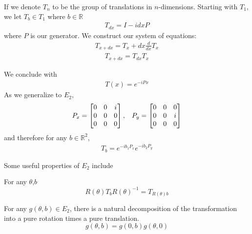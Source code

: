 \documentclass[compress,aspectratio=169,10pt,usenames,dvipsnames]{beamer}
\newcommand{\R}{\mathbb{R}}
\begin{document}
%
%
\begin{frame}
If we denote $T_n$ to be the group of translations in $n$-dimensions.
\vfill
Starting with $T_1$, we let $T_b\in T_1$ where $b\in \R$
\begin{equation}
\begin{aligned}
T_{dx} = I -idxP
\end{aligned}
\end{equation}
where $P$ is our generator.
\vfill
We construct our system of equations:
\begin{equation}\begin{aligned}T_{x+dx} = T_x + dx \frac{d}{dx}T_x\end{aligned}\end{equation}
\begin{equation}\begin{aligned}T_{x+dx} = T_{dx}T_x\end{aligned}\end{equation}
\vfill
\end{frame}
\begin{frame}
\vfill
We conclude with 
\begin{equation}\begin{aligned}T(x) = e^{-iPx}\end{aligned}\end{equation}
\vfill
As we generalize to $E_2$,
\begin{equation}\begin{aligned}P_x = \begin{bmatrix}
			0 & 0 & i\\
			0 & 0 & 0 \\
			0 & 0 & 0
		\end{bmatrix}, \hspace{3mm}P_y = \begin{bmatrix}
			0 & 0 & 0\\
			0 & 0 & i \\
			0 & 0 & 0
		\end{bmatrix}\end{aligned}\end{equation}
\vfill
and therefore for any $b\in\R^2$, 
\begin{equation}\begin{aligned}T_b = e^{-ib_1P_x}e^{-ib_2P_y}\end{aligned}\end{equation}
\end{frame}
%
%
\begin{frame}
\vfill
Some useful properties of $E_2$ include
\vfill
\begin{theorem}
	For any $\theta$,$b$
	$$R(\theta)T_bR(\theta)^{-1} = T_{R(\theta)b}$$
\end{theorem}
\vfill
\begin{theorem}
	For any $g(\theta,b)\in E_2$, there is a natural decomposition of the transformation into a pure rotation times a pure translation.
$$g(\theta,b) = g(0,b)g(\theta,0)$$
\end{theorem}
\vfill
\end{frame}
\end{document}
